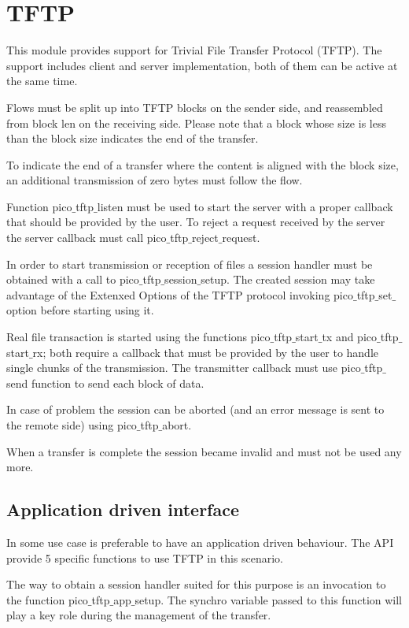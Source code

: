 \section{TFTP}

This module provides support for Trivial File Transfer Protocol (TFTP).
The support includes client and server implementation, both of them can be active at the same time.

Flows must be split up into TFTP blocks on the sender side, and reassembled from block len
on the receiving side. Please note that a block whose size is less than the block size indicates
the end of the transfer. 

To indicate the end of a transfer where the content is aligned with the block size, an additional  
transmission of zero bytes must follow the flow.

Function pico$\_$tftp$\_$listen must be used to start the server with a proper callback that should be provided by the user. To reject a request received by the server the server callback must call pico$\_$tftp$\_$reject$\_$request.

In order to start transmission or reception of files a session handler must be obtained with a call to pico$\_$tftp$\_$session$\_$setup. The created session may take advantage of the Extenxed Options of the TFTP protocol invoking pico$\_$tftp$\_$set$\_$option before starting using it.

Real file transaction is started using the functions pico$\_$tftp$\_$start$\_$tx and pico$\_$tftp$\_$start$\_$rx; both require a callback that must be provided by the user to handle single chunks of the transmission. The transmitter callback must use pico$\_$tftp$\_$send function to send each block of data.

In case of problem the session can be aborted (and an error message is sent to the remote side) using pico$\_$tftp$\_$abort.

When a transfer is complete the session became invalid and must not be used any more.

\subsection*{Application driven interface}

In some use case is preferable to have an application driven behaviour. The API provide 5 specific functions to use TFTP in this scenario.

The way to obtain a session handler suited for this purpose is an invocation to the function pico$\_$tftp$\_$app$\_$setup. The synchro variable passed to this function will play a key role during the management of the transfer.

